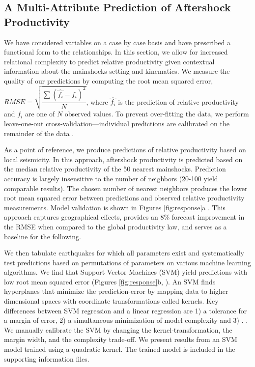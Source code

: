 \documentclass[draft, jgrga]{agujournal2018}
\begin{document}
    \subsection{A Multi-Attribute Prediction of Aftershock Productivity}
    
    We have considered variables on a case by case basis and have prescribed a functional form to the relationships. In this section, we allow for increased relational complexity to predict relative productivity given contextual information about the mainshocks setting and kinematics. We measure the quality of our predictions by computing the root mean squared error, $RMSE = \sqrt{\dfrac{\sum{(\hat{f_i}-f_i)^2}}{N}}$, where $\hat{f_i}$ is the prediction of relative productivity and $f_i$ are one of $N$ observed values. To prevent over-fitting the data, we perform leave-one-out cross-validation---individual predictions are calibrated on the remainder of the data \citep{witten2011}. 
    
    As a point of reference, we produce predictions of relative productivity based on local seismicity. In this approach, aftershock productivity is predicted based on the median relative productivity of the 50 nearest mainshocks. Prediction accuracy is largely insensitive to the number of neighbors (20-100 yield comparable results). The chosen number of nearest neighbors produces the lower root mean squared error between predictions and observed relative productivity measurements. Model validation is shown in Figures \ref{fig:response}a . This approach captures geographical effects, provides an 8\% forecast improvement in the RMSE when compared to the global productivity law, and serves as a baseline for the following.
    
    We then tabulate earthquakes for which all parameters exist and systematically test predictions based on permutations of parameters on various machine learning algorithms. We find that Support Vector Machines (SVM) yield predictions with low root mean squared error (Figures \ref{fig:response}b, ). An SVM finds hyperplanes that minimize the prediction-error by mapping data to higher dimensional spaces with coordinate transformations called kernels. Key differences between SVM regression and a linear regression are 1) a tolerance for a margin of error, 2) a simultaneous minimization of model complexity and 3) .  \citep{witten2011}. We manually calibrate the SVM by changing the kernel-transformation, the margin width, and the complexity trade-off. We present results from an SVM model trained using a quadratic kernel. The trained model is included in the supporting information files.
    
\end{document}
